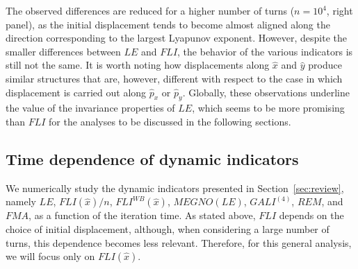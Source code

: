 
The observed differences are reduced for a higher number of turns ($n=10^4$, right panel), as the initial displacement tends to become almost aligned along the direction corresponding to the largest Lyapunov exponent. However, despite the smaller differences between $LE$ and $FLI$, the behavior of the various indicators is still not the same. It is worth noting how displacements along $\hat{x}$ and $\hat{y}$ produce similar structures that are, however, different with respect to the case in which displacement is carried out along $\hat{p}_x$ or $\hat{p}_y$. Globally, these observations underline the value of the invariance properties of $LE$, which seems to be more promising than $FLI$ for the analyses to be discussed in the following sections.

\subsection{Time dependence of dynamic indicators\label{subsec:timedep}}

We numerically study the dynamic indicators presented in Section~\ref{sec:review}, namely $LE$, $FLI(\hat{x})/n$, $FLI^{WB}(\hat{x})$, $MEGNO(LE)$, $GALI^{(4)}$, $REM$, and $FMA$, as a function of the iteration time. As stated above, $FLI$ depends on the choice of initial displacement, although, when considering a large number of turns, this dependence becomes less relevant. Therefore, for this general analysis, we will focus only on $FLI(\hat{x})$.

